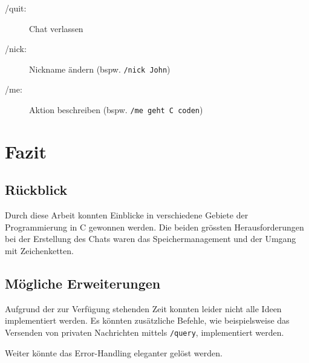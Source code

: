 \documentclass[a4paper]{article}
\begin{document}
\begin{description}
    \item[/quit:] Chat verlassen
    \item[/nick:] Nickname ändern (bspw. \texttt{/nick John})
    \item[/me:] Aktion beschreiben (bspw. \texttt{/me geht C coden})
\end{description}

\section{Fazit}
\subsection{Rückblick}
Durch diese Arbeit konnten Einblicke in verschiedene Gebiete der Programmierung in C gewonnen werden. Die beiden grössten Herausforderungen bei der Erstellung des Chats waren das Speichermanagement und der Umgang mit Zeichenketten.

\subsection{Mögliche Erweiterungen}
Aufgrund der zur Verfügung stehenden Zeit konnten leider nicht alle Ideen implementiert werden. Es könnten zusätzliche Befehle, wie beispielsweise das Versenden von privaten Nachrichten mittels \texttt{/query}, implementiert werden.

Weiter könnte das Error-Handling eleganter gelöst werden.
\end{document}
